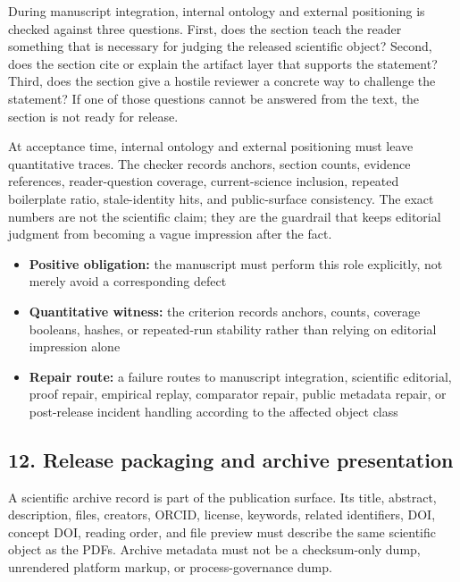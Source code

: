 During manuscript integration, internal ontology and external positioning is checked against three questions. First, does the section teach the reader something that is necessary for judging the released scientific object? Second, does the section cite or explain the artifact layer that supports the statement? Third, does the section give a hostile reviewer a concrete way to challenge the statement? If one of those questions cannot be answered from the text, the section is not ready for release.


At acceptance time, internal ontology and external positioning must leave quantitative traces. The checker records anchors, section counts, evidence references, reader-question coverage, current-science inclusion, repeated boilerplate ratio, stale-identity hits, and public-surface consistency. The exact numbers are not the scientific claim; they are the guardrail that keeps editorial judgment from becoming a vague impression after the fact.


\begin{itemize}[leftmargin=1.8em]

\item \textbf{Positive obligation:} the manuscript must perform this role explicitly, not merely avoid a corresponding defect

\item \textbf{Quantitative witness:} the criterion records anchors, counts, coverage booleans, hashes, or repeated-run stability rather than relying on editorial impression alone

\item \textbf{Repair route:} a failure routes to manuscript integration, scientific editorial, proof repair, empirical replay, comparator repair, public metadata repair, or post-release incident handling according to the affected object class

\end{itemize}

\subsection{12. Release packaging and archive presentation}

A scientific archive record is part of the publication surface. Its title, abstract, description, files, creators, ORCID, license, keywords, related identifiers, DOI, concept DOI, reading order, and file preview must describe the same scientific object as the PDFs. Archive metadata must not be a checksum-only dump, unrendered platform markup, or process-governance dump.


